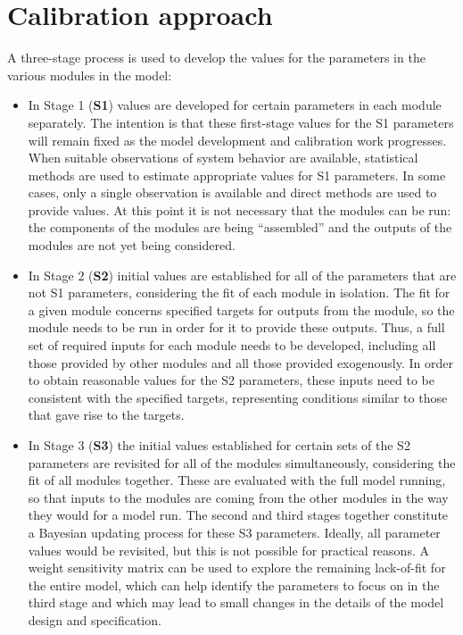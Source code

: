 \section{Calibration approach}\label{sec:calibration-approach}
A three-stage process is used to develop the values for the parameters in the various modules in the model:
\begin{itemize}
\item In Stage 1 (\textbf{S1}) values are developed for certain parameters in each module separately. The intention is that these first-stage values for the S1 parameters will remain fixed as the model development and calibration work progresses. When suitable observations of system behavior are available, statistical methods are used to estimate appropriate values for S1 parameters. In some cases, only a single observation is available and direct methods are used to provide values. At this point it is not necessary that the modules can be run: the components of the modules are being ``assembled'' and the outputs of the modules are not yet being considered.
\item In Stage 2 (\textbf{S2}) initial values are established for all of the parameters that are not S1 parameters, considering the fit of each module in isolation. The fit for a given module concerns specified targets for outputs from the module, so the module needs to be run in order for it to provide these outputs. Thus, a full set of required inputs for each module needs to be developed, including all those provided by other modules and all those provided exogenously. In order to obtain reasonable values for the S2 parameters, these inputs need to be consistent with the specified targets, representing conditions similar to those that gave rise to the targets.
\item In Stage 3 (\textbf{S3}) the initial values established for certain sets of the S2 parameters are revisited for all of the modules simultaneously, considering the fit of all modules together. These are evaluated with the full model running, so that inputs to the modules are coming from the other modules in the way they would for a model run. The second and third stages together constitute a Bayesian updating process for these S3 parameters. Ideally, all parameter values would be revisited, but this is not possible for practical reasons. A weight sensitivity matrix can be used to explore the remaining lack-of-fit for the entire model, which can help identify the parameters to focus on in the third stage and which may lead to small changes in the details of the model design and specification.
\end{itemize}

